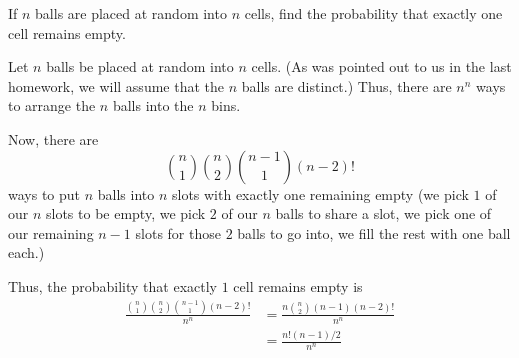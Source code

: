 \begin{problem}[Handout 2, \# 12]
  If \(n\) balls are placed at random into \(n\) cells, find the
  probability that exactly one cell remains empty.
\end{problem}
\begin{solution}
  Let \(n\) balls be placed at random into \(n\) cells. (As was pointed out
  to us in the last homework, we will assume that the \(n\) balls are
  distinct.) Thus, there are \(n^n\) ways to arrange the \(n\) balls into
  the \(n\) bins.

  Now, there are
  \[
    \binom{n}{1}\binom{n}{2}\binom{n-1}{1}(n-2)!
  \]
  ways to put $n$ balls into $n$ slots with exactly one remaining empty (we
  pick $1$ of our $n$ slots to be empty, we pick $2$ of our $n$ balls to
  share a slot, we pick one of our remaining $n-1$ slots for those $2$
  balls to go into, we fill the rest with one ball each.)

  Thus, the probability that exactly $1$ cell remains empty is
  \begin{align*}
    \frac{\displaystyle\binom{n}{1}\binom{n}{2}\binom{n-1}{1}(n-2)!}{n^n}
    &= \frac{\displaystyle n\binom{n}{2}(n-1)(n-2)!}{n^n} \\
    &= \frac{n!(n-1)/2}{n^n} \\
\end{align*}
\end{solution}
\newpage



